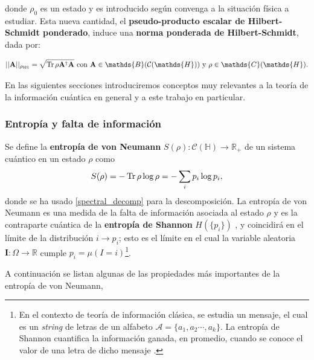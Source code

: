 \documentclass{report} %
\numberwithin{equation}{section}
\begin{document}
\noindent donde $\rho_0$ es un estado y es introducido según convenga a la situación física a estudiar. Esta nueva cantidad, el \textbf{pseudo-producto escalar de Hilbert-Schmidt ponderado}, induce  una \textbf{norma ponderada de Hilbert-Schmidt}, dada por:

\begin{equation}
    ||{\bf A}||_{\rho_{\textnormal{HS}}} = \sqrt{\Tr \rho \bf A^{\dagger}{\bf A}} \textnormal{ con } {\bf A} \in \mathds{B}(\mathcal{C}(\mathds{H})) \textnormal{ y } \rho \in \mathds{C}(\mathds{H}). 
    \label{modified HS norm}
\end{equation}

En las siguientes secciones introduciremos conceptos muy relevantes a la teoría de la información cuántica en general y a este trabajo en particular. 

\subsubsection{Entropía y falta de información}
 Se define la \textbf{entropía de von Neumann} $S(\rho): \mathcal{C}(\mathds{H}) \rightarrow \mathds{R}_{+}$ de un sistema cuántico en un estado $\rho$ \cite{Nielsen.00, HeinzPetruccione, VonNeumann:1955, WehrlA, Neumann1927} como 
 \begin{align}
     S(\rho) = - \Tr \rho \log \rho = - \sum_i p_i \log p_i,
     \label{von Neumann's entropy}
 \end{align}
 donde se ha usado \eqref{spectral_decomp} para la descomposición.
 La entropía de von Neumann es una medida de la falta de información asociada al estado $\rho$ y es la contraparte cuántica de la \textbf{entropía de Shannon} $H(\{p_i\})$
 \cite{Shannon48}, y coincidirá en el límite de la distribución $i \rightarrow p_i$; esto es el límite en el cual la variable aleatoria $\mathbf{I}: \Omega \rightarrow \mathds{R}$ cumple $p_i = \mu (I=i)$\footnote{ En el contexto de teoría de información clásica, se estudia un mensaje, el cual es un \textit{string} de letras de un alfabeto $\mathcal{A}=\{a_1,a_2 \cdots, a_k\}$. La entropía de Shannon cuantifica la información ganada, en promedio, cuando se conoce el valor de una letra de dicho mensaje \cite{BE07}. }\cite{HeinzPetruccione, BE07}.

 A continuación se listan algunas de las propiedades más importantes de la entropía de von Neumann,
 
\end{document}
